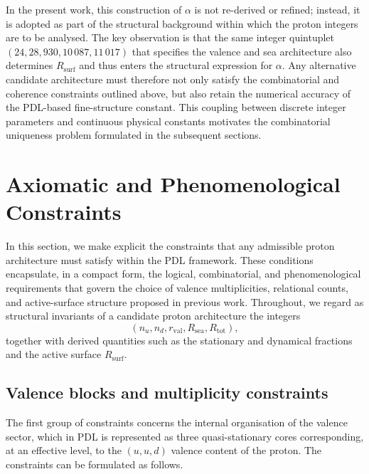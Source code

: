 \documentclass[11pt,a4paper]{article}
\begin{document}
In the present work, this construction of $\alpha$ is not re-derived or refined; instead, it is adopted as part of the structural background within which the proton integers are to be analysed. The key observation is that the same integer quintuplet $(24,28,930,10\,087,11\,017)$ that specifies the valence and sea architecture also determines $R_{\mathrm{surf}}$ and thus enters the structural expression for $\alpha$. Any alternative candidate architecture must therefore not only satisfy the combinatorial and coherence constraints outlined above, but also retain the numerical accuracy of the PDL-based fine-structure constant. This coupling between discrete integer parameters and continuous physical constants motivates the combinatorial uniqueness problem formulated in the subsequent sections.

\section{Axiomatic and Phenomenological Constraints}
\label{sec:constraints}

In this section, we make explicit the constraints that any admissible proton architecture must satisfy within the PDL framework. These conditions encapsulate, in a compact form, the logical, combinatorial, and phenomenological requirements that govern the choice of valence multiplicities, relational counts, and active-surface structure proposed in previous work.\cite{LaubscherIntroPDL2026,LaubscherPDLFull2026,LaubscherLDP2026,LaubscherDerivationAlpha2026} Throughout, we regard as structural invariants of a candidate proton architecture the integers
\begin{equation}
(n_u,n_d,r_{\mathrm{val}},R_{\mathrm{sea}},R_{\mathrm{tot}}),
\end{equation}
together with derived quantities such as the stationary and dynamical fractions and the active surface $R_{\mathrm{surf}}$.

\subsection{Valence blocks and multiplicity constraints}

The first group of constraints concerns the internal organisation of the valence sector, which in PDL is represented as three quasi-stationary cores corresponding, at an effective level, to the $(u,u,d)$ valence content of the proton.\cite{LaubscherPDLFull2026,LaubscherLDP2026} The constraints can be formulated as follows.
\end{document}
